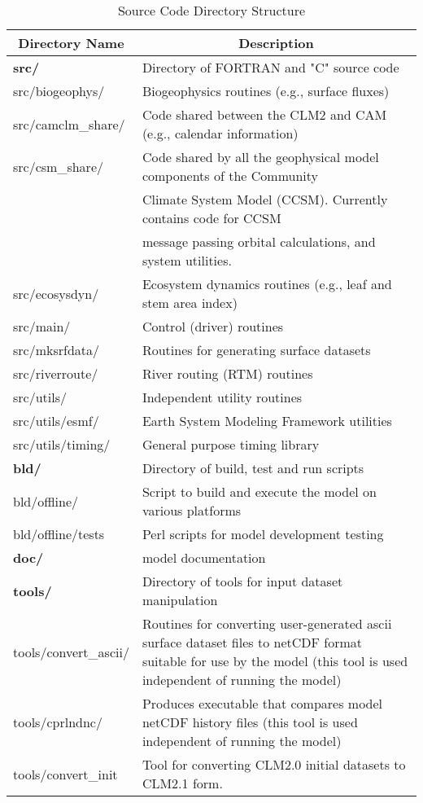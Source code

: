 \begin{longtable}{|p{1.5in}|p{4.5in}|}
\caption{\label{source_directory} Source Code Directory Structure} \\
\hline
\endhead
\hline
\multicolumn{1}{|c|}{\bf Directory Name} & 
\multicolumn{1}{|c|}{\bf Description}  \\ \hline 
{\bf src/}           &   Directory of FORTRAN and "C" source code \\ \hline
src/biogeophys/      &   Biogeophysics routines (e.g., surface fluxes) \\ \hline
src/camclm\_share/   &   Code shared between the CLM2 and CAM (e.g., calendar information) \\ \hline
src/csm\_share/      &   Code shared by all the geophysical model components of the Community \\
                     &   Climate System Model (CCSM). Currently contains code for CCSM \\
                     &   message passing orbital calculations, and system utilities. \\ \hline
src/ecosysdyn/       &   Ecosystem dynamics routines (e.g., leaf and stem area index) \\ \hline
src/main/            &   Control (driver) routines \\ \hline
src/mksrfdata/       &   Routines for generating surface datasets \\ \hline
src/riverroute/      &   River routing (RTM) routines \\ \hline
src/utils/           &   Independent utility routines \\ \hline
src/utils/esmf/      &   Earth System Modeling Framework utilities \\ \hline
src/utils/timing/    &   General purpose timing library \\ \hline
{\bf bld/}           &   Directory of build, test and run scripts \\ \hline        
bld/offline/         &   Script to build and execute the model on various platforms\\ \hline
bld/offline/tests    &   Perl scripts for model development testing   \\ \hline
{\bf doc/}           &   model documentation \\ \hline
{\bf tools/}         &   Directory of tools for input dataset manipulation \\ \hline
tools/convert\_ascii/ &   Routines for converting user-generated ascii surface dataset files to netCDF format suitable for use by the model (this tool is used independent of running the model) \\ \hline
tools/cprlndnc/      &   Produces executable that compares model netCDF history files (this tool is used independent of running the model) \\ \hline
tools/convert\_init   &   Tool for converting CLM2.0 initial datasets to CLM2.1 form. \\ \hline
\end{longtable}

